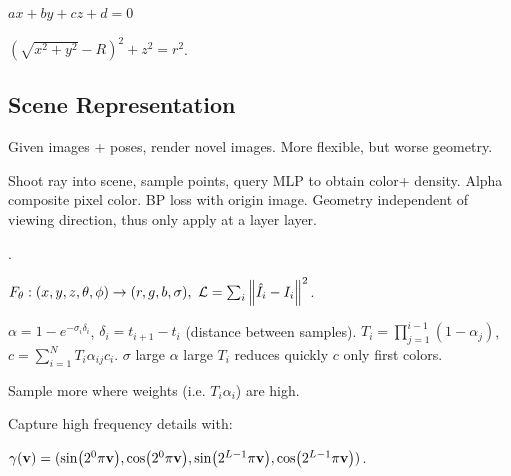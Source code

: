 \begin{definition}
    \(ax + by + cz + d = 0\)
\end{definition}

\begin{definition}
    \((\sqrt{x^2 + y^2} - R)^2 + z^2 = r^2\).
\end{definition}

\subsection{Scene Representation}
Given images + poses, render novel images. More flexible, but worse geometry.

\begin{definition}
    Shoot ray into scene, sample points, query MLP to obtain color+ density. Alpha composite pixel color. BP loss with origin image. Geometry independent of viewing direction, thus only apply at a layer layer.

     .
\end{definition}

\begin{definition}[Training]
    \(F_\theta: (x, y, z, \theta, \phi) \to (r, g, b, \sigma), \ \mathcal{L} = \sum_i \norm{\hat I_i - I_i}^2\).
\end{definition}

\begin{definition}
    \(\alpha = 1 - e^{-\sigma_i \delta_i}\), \(\delta_i = t_{i+1} - t_i\) (distance between samples).
    \(T_i = \prod_{j = 1}^{i-1}(1 - \alpha_j)\), \(c = \sum_{i = 1}^N T_i \alpha_{ij} c_i\). \(\sigma\) large \(\alpha\) large \(T_i\) reduces quickly \(c\) only first colors.
\end{definition}

\begin{definition}
    Sample more where weights (i.e. \(T_i \alpha_i\)) are high.
\end{definition}

\begin{definition}
    Capture high frequency details with:
    
    \(\gamma(\vb{v}) = (\sin(2^0 \pi \vb{v}), \cos(2^0 \pi \vb{v}), \sin(2^{L-1}\pi\vb{v}), \cos(2^{L-1}\pi\vb{v}))\).
\end{definition}


